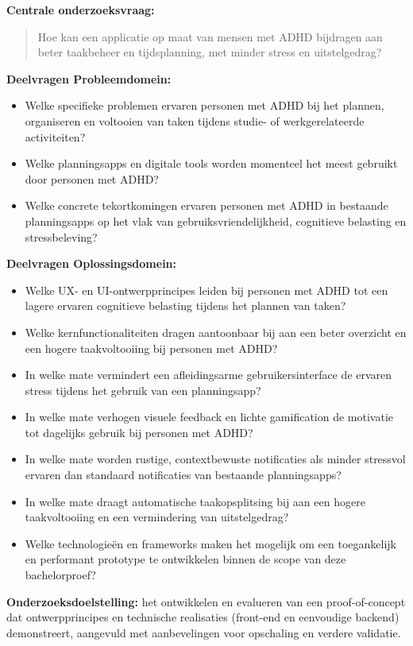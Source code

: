 \medskip
\textbf{Centrale onderzoeksvraag:}
\begin{quote}
Hoe kan een applicatie op maat van mensen met ADHD bijdragen aan beter taakbeheer en tijdsplanning, met minder stress en uitstelgedrag?
\end{quote}

\medskip
\textbf{Deelvragen Probleemdomein:}
\begin{itemize}
  \item Welke specifieke problemen ervaren personen met ADHD bij het plannen, organiseren en voltooien van taken tijdens studie- of werkgerelateerde activiteiten?
  \item Welke planningsapps en digitale tools worden momenteel het meest gebruikt door personen met ADHD?
  \item Welke concrete tekortkomingen ervaren personen met ADHD in bestaande planningsapps op het vlak van gebruiksvriendelijkheid, cognitieve belasting en stressbeleving?
\end{itemize}

\medskip
\textbf{Deelvragen Oplossingsdomein:}
\begin{itemize}
  \item Welke UX- en UI-ontwerpprincipes leiden bij personen met ADHD tot een lagere ervaren cognitieve belasting tijdens het plannen van taken?
  \item Welke kernfunctionaliteiten dragen aantoonbaar bij aan een beter overzicht en een hogere taakvoltooiing bij personen met ADHD?
  \item In welke mate vermindert een afleidingsarme gebruikersinterface de ervaren stress tijdens het gebruik van een planningsapp?
  \item In welke mate verhogen visuele feedback en lichte gamification de motivatie tot dagelijks gebruik bij personen met ADHD?
  \item In welke mate worden rustige, contextbewuste notificaties als minder stressvol ervaren dan standaard notificaties van bestaande planningsapps?
  \item In welke mate draagt automatische taakopsplitsing bij aan een hogere taakvoltooiing en een vermindering van uitstelgedrag?
  \item Welke technologieën en frameworks maken het mogelijk om een toegankelijk en performant prototype te ontwikkelen binnen de scope van deze bachelorproef?
\end{itemize}

\medskip
\textbf{Onderzoeksdoelstelling:} het ontwikkelen en evalueren van een proof-of-concept dat ontwerpprincipes en technische realisaties (front-end en eenvoudige backend) demonstreert, aangevuld met aanbevelingen voor opschaling en verdere validatie.

